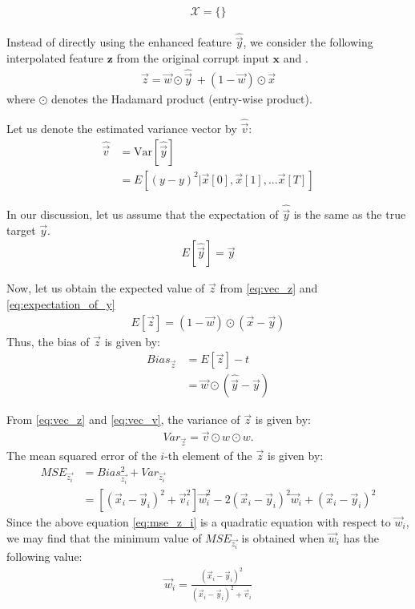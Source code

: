 \documentclass{article}
\begin{document}
\begin{align}
  \mathcal{X} = \{  \}
\end{align}

Instead of directly using the enhanced feature $\widehat{\vec{y}}$, we consider
the following interpolated feature $\bm{z}$ from the original corrupt
input $\bm{x}$ and .
\begin{align}
  \vec{z} = \vec{w} \odot \widehat{\vec{y}} \ + (1 - \vec{w}) \odot \vec{x} 
    \label{eq:vec_z}
\end{align}
where $\odot$ denotes the Hadamard product (entry-wise product).

Let us denote the estimated variance vector by $\hat{\vec{v}}$:
\begin{align}
  \hat{\vec{v}} & = \text{Var}[\widehat{\vec{y}}] \nonumber \\
                & = E[(y - y)^2 | \vec{x}[0], \vec{x}[1], ... \vec{x}[T]]
     \label{eq:vec_v}
\end{align}

In our discussion, let us assume that the expectation of $\hat{\vec{y}}$ is the
same as the true target $\vec{y}$.
\begin{align}
  E[\widehat{\vec{y}}] = \vec{y}  \label{eq:expectation_of_y}
\end{align}

Now, let us obtain the expected value of $\vec{z}$ from
\eqref{eq:vec_z} and \eqref{eq:expectation_of_y}
\begin{align}
  E[\vec{z}] = (1 - \vec{w}) \odot (\vec{x} - \vec{y})
\end{align}
Thus, the bias of $\vec{z}$ is given by:
\begin{align}
  Bias_{\vec{z}} & = E[\vec{z}] - t \nonumber \\
                 & = \vec{w} \odot (\widehat{\vec{y}} - \vec{y})
\end{align}

From \eqref{eq:vec_z} and \eqref{eq:vec_v}, the variance of $\vec{z}$ is given by:
\begin{align}
  Var_{\vec{z}} = \vec{v} \odot w \odot w.
\end{align}
The mean squared error of the $i$-th element of the $\vec{z}$ is given by:
\begin{align}
  MSE_{\vec{z_i}} & = Bias_{\vec{z_i}}^2 + Var_{\vec{z_i}} \nonumber \\
                 & =  \left[(\vec{x}_i - \vec{y}_i) ^ 2
                    + \vec{v}_i^2 \right] \vec{w}_i^{2}
                    - 2 (\vec{x}_i - \vec{y}_i)^{2}  \vec{w}_i
                    + (\vec{x}_i - \vec{y}_i)^{2}
 \label{eq:mse_z_i}
\end{align}
Since the above equation \eqref{eq:mse_z_i} is a quadratic equation with
respect to $\vec{w}_i$, we may find that the minimum value of $MSE_{\vec{z_i}}$
is obtained when $\vec{w}_i$ has the following value:
\begin{align}
  \vec{w}_i = \frac{(\vec{x}_i - \vec{y}_i)^2}{(\vec{x}_i - \vec{y}_i)^2 + \vec{v}_i}
\end{align}
\end{document}
